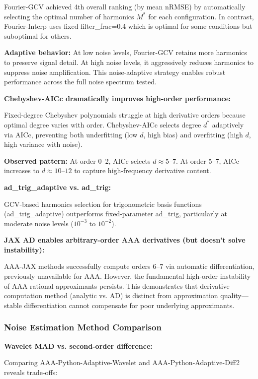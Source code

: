 Fourier-GCV achieved 4th overall ranking (by mean nRMSE) by automatically selecting the optimal number of harmonics $M^*$ for each configuration. In contrast, Fourier-Interp uses fixed filter\_frac=0.4 which is optimal for some conditions but suboptimal for others.

\textbf{Adaptive behavior:} At low noise levels, Fourier-GCV retains more harmonics to preserve signal detail. At high noise levels, it aggressively reduces harmonics to suppress noise amplification. This noise-adaptive strategy enables robust performance across the full noise spectrum tested.

\textbf{Chebyshev-AICc dramatically improves high-order performance:}

Fixed-degree Chebyshev polynomials struggle at high derivative orders because optimal degree varies with order. Chebyshev-AICc selects degree $d^*$ adaptively via AICc, preventing both underfitting (low $d$, high bias) and overfitting (high $d$, high variance with noise).

\textbf{Observed pattern:} At order 0--2, AICc selects $d \approx 5$--$7$. At order 5--7, AICc increases to $d \approx 10$--$12$ to capture high-frequency derivative content.

\textbf{ad\_trig\_adaptive vs. ad\_trig:}

GCV-based harmonics selection for trigonometric basis functions (ad\_trig\_adaptive) outperforms fixed-parameter ad\_trig, particularly at moderate noise levels ($10^{-3}$ to $10^{-2}$).

\textbf{JAX AD enables arbitrary-order AAA derivatives (but doesn't solve instability):}

AAA-JAX methods successfully compute orders 6--7 via automatic differentiation, previously unavailable for AAA. However, the fundamental high-order instability of AAA rational approximants persists. This demonstrates that derivative computation method (analytic vs. AD) is distinct from approximation quality—stable differentiation cannot compensate for poor underlying approximants.

\subsubsection{Noise Estimation Method Comparison}

\textbf{Wavelet MAD vs. second-order difference:}

Comparing AAA-Python-Adaptive-Wavelet and AAA-Python-Adaptive-Diff2 reveals trade-offs:

